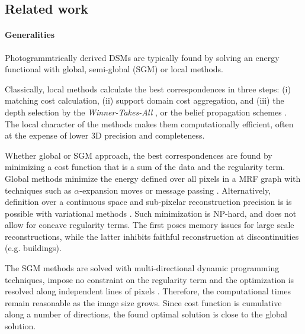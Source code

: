 \documentclass[journal]{IEEEtran}
\begin{document}
 
 
 

\subsection{Related work}
\paragraph{Generalities}
Photogrammtrically derived DSMs are typically found by solving an energy functional with {global}, semi-global (SGM) or local methods.\par  
Classically, local methods calculate the best correspondences in three steps: (i) matching cost calculation, (ii) support domain cost aggregation, and (iii) the depth selection by the \textit{Winner-Takes-All}  \cite{yoon2005locally}, or the belief propagation schemes \cite{bleyer2011patchmatch,galliani2015massively}. The local character of the methods makes them computationally efficient, often at the expense of lower 3D precision and completeness.\par 
%
Whether global or SGM approach, the best correspondences are found by minimizing a cost function that is a sum of the data and the regularity term. Global methods minimize the energy defined over all pixels in a MRF graph with techniques such as $\alpha$-expansion moves \cite{boykov2001fast,taniai2017continuous} or message passing \cite{felzenszwalb2006efficient}. Alternatively, definition over a continuous space and sub-pixelar reconstruction precision is is possible with variational methods \cite{ranftl2012pushing}. Such minimization is NP-hard, and does not allow for concave regularity terms. The first poses memory issues for large scale reconstructions, while the latter inhibits faithful reconstruction at discontinuities (e.g. buildings). \par 
%
The SGM methods are solved with multi-directional dynamic programming techniques, impose no constraint on the regularity term and the optimization is resolved along independent lines of pixels \cite{mpd:06:sgm,hirschmuller:08:sgm}. Therefore, the computational times remain reasonable as the image size grows. Since cost function is cumulative along a number of directions, the found optimal solution is close to the global solution. \par 
%
 
\end{document}
